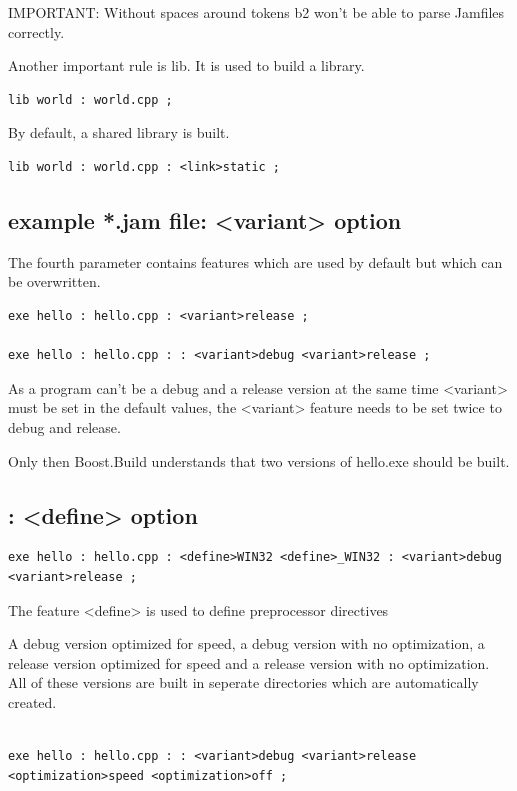 IMPORTANT: Without spaces around tokens b2 won't be able to parse Jamfiles correctly.

Another important rule is lib. It is used to build a library.
\begin{verbatim}
lib world : world.cpp ; 
\end{verbatim}
By default, a shared library is built.
\begin{verbatim}
lib world : world.cpp : <link>static ; 
\end{verbatim}


\subsection{example *.jam file: <variant> option}

The fourth parameter contains features which are used by default but which can be overwritten.
\begin{verbatim}
exe hello : hello.cpp : <variant>release ; 

exe hello : hello.cpp : : <variant>debug <variant>release ; 
\end{verbatim}
As a program can't be a debug and a release version at the same time <variant> must be set in the default values, 
the <variant> feature needs to be set twice to debug and release.

Only then Boost.Build understands that two versions of hello.exe should be built.

\subsection{: <define> option}
\begin{verbatim}
exe hello : hello.cpp : <define>WIN32 <define>_WIN32 : <variant>debug <variant>release ; 

\end{verbatim}

The feature <define> is used to define preprocessor directives

A debug version optimized for speed, a debug version with no optimization, a release version optimized for speed and a release version with no optimization.
All of these versions are built in seperate directories which are automatically created.
\begin{verbatim}

exe hello : hello.cpp : : <variant>debug <variant>release <optimization>speed <optimization>off ; 

\end{verbatim}


